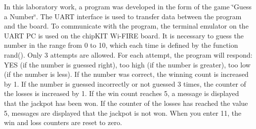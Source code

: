 In this laboratory work, a program was developed in the form of the game \char`\"{}\+Guess a Number\char`\"{}. The U\+A\+RT interface is used to transfer data between the program and the board. To communicate with the program, the terminal emulator on the U\+A\+RT PC is used on the chip\+K\+IT Wi-\/\+F\+I\+RE board. It is necessary to guess the number in the range from 0 to 10, which each time is defined by the function rand(). Only 3 attempts are allowed. For each attempt, the program will respond\+: Y\+ES (if the number is guessed right), too high (if the number is greater), too low (if the number is less). If the number was correct, the winning count is increased by 1. If the number is guessed incorrectly or not guessed 3 times, the counter of the losses is increased by 1. If the win count reaches 5, a message is displayed that the jackpot has been won. If the counter of the losses has reached the value 5, messages are displayed that the jackpot is not won. When you enter 11, the win and loss counters are reset to zero. 